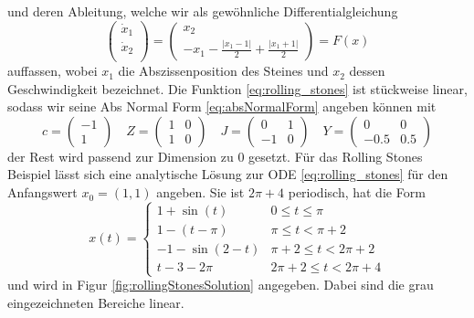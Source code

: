 und deren Ableitung, welche wir als gewöhnliche Differentialgleichung
 \begin{equation}
  \begin{pmatrix}
   \dot x_1 \\
   \dot x_2 \\
  \end{pmatrix}
 = 
 \begin{pmatrix}
  x_2 \\
  -x_1 - \frac{|x_1-1|}{2} + \frac{|x_1+1|}{2}
 \end{pmatrix}
=F(x)
\label{eq:rolling_stones}
 \end{equation}
auffassen, wobei $x_1$ die Abszissenposition des Steines und $x_2$ dessen Geschwindigkeit bezeichnet.
Die Funktion \eqref{eq:rolling_stones} ist stückweise linear, sodass wir seine Abs Normal Form \eqref{eq:absNormalForm} angeben können mit
\[
c = \begin{pmatrix}
     -1\\
     1
    \end{pmatrix}
\quad
 Z = \begin{pmatrix}
      1 & 0 \\
      1 & 0
     \end{pmatrix}\quad
J = \begin{pmatrix}
      0&1\\
      -1 & 0
     \end{pmatrix}\quad
 Y = \begin{pmatrix}
      0 & 0\\
      -0.5  & 0.5
     \end{pmatrix}
\]
der Rest wird passend zur Dimension zu $0$ gesetzt. Für das Rolling Stones Beispiel lässt sich eine analytische Lösung zur ODE \eqref{eq:rolling_stones} für den Anfangswert $x_0=(1,1)$ angeben. Sie ist $2\pi+4$ periodisch, hat die Form
\begin{equation}
 x(t) = \begin{cases}
         1+\sin(t) 	& 0\leq t \leq \pi	\\
         1-(t-\pi) 	& \pi \leq t < \pi+2	\\ 
         -1 - \sin(2-t) 	& \pi+2\leq t<2\pi+2	\\
         t-3-2\pi	& 2\pi+2 \leq t<2\pi +4
        \end{cases}
\label{eq:analyticSolRolling}
\end{equation}
und wird in Figur \ref{fig:rollingStonesSolution} angegeben. Dabei sind die grau eingezeichneten Bereiche linear.

